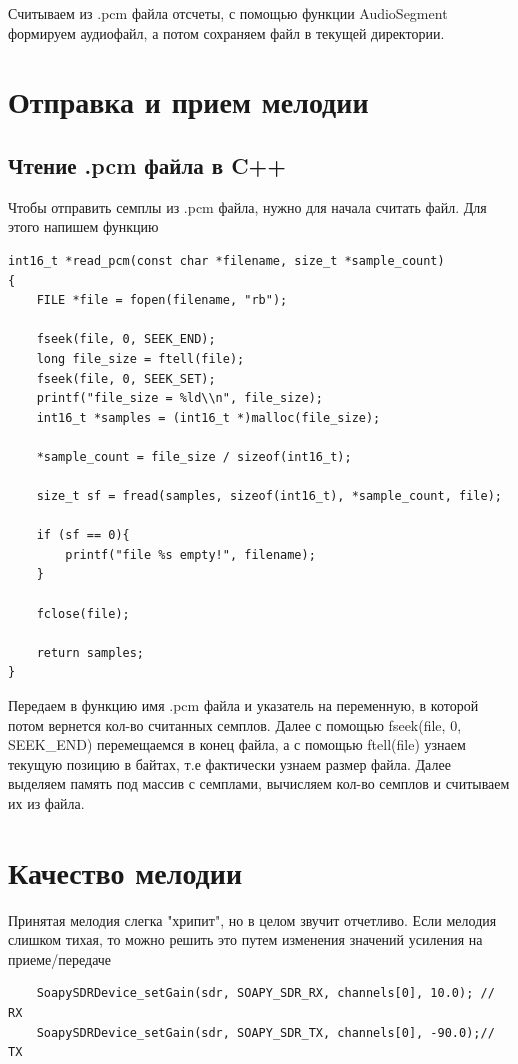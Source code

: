Считываем из .pcm файла отсчеты, с помощью функции AudioSegment формируем аудиофайл, а потом сохраняем файл в текущей директории.

\section{Отправка и прием мелодии}


\subsection{Чтение .pcm файла в C++}

Чтобы отправить семплы из .pcm файла, нужно для начала считать файл. Для этого напишем функцию

\begin{lstlisting}
int16_t *read_pcm(const char *filename, size_t *sample_count)
{
    FILE *file = fopen(filename, "rb");

    fseek(file, 0, SEEK_END);
    long file_size = ftell(file);
    fseek(file, 0, SEEK_SET);
    printf("file_size = %ld\\n", file_size);
    int16_t *samples = (int16_t *)malloc(file_size);

    *sample_count = file_size / sizeof(int16_t);

    size_t sf = fread(samples, sizeof(int16_t), *sample_count, file);

    if (sf == 0){
        printf("file %s empty!", filename);
    }

    fclose(file);

    return samples;
}
\end{lstlisting}

Передаем в функцию имя .pcm файла и указатель на переменную, в которой потом вернется кол-во считанных семплов. Далее с помощью 
fseek(file, 0, SEEK\_END) перемещаемся в конец файла, а с помощью ftell(file) узнаем текущую позицию в байтах, т.е фактически
узнаем размер файла. Далее выделяем память под массив с семплами, вычисляем кол-во семплов и считываем их из файла.

\section{Качество мелодии}

Принятая мелодия слегка "хрипит", но в целом звучит отчетливо. Если мелодия слишком тихая, то можно решить это путем изменения
значений усиления на приеме/передаче

\begin{lstlisting}
    SoapySDRDevice_setGain(sdr, SOAPY_SDR_RX, channels[0], 10.0); // RX
    SoapySDRDevice_setGain(sdr, SOAPY_SDR_TX, channels[0], -90.0);// TX
\end{lstlisting}

